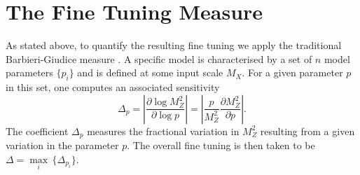 \documentclass[preprint,amsmath,amssymb,aps,superscriptaddress,prd,showpacs,floatfix,nofootinbib]{revtex4-1}
\begin{document}
\section{\label{sec:tuningmeasure}The Fine Tuning Measure}
As stated above, to quantify the resulting fine tuning we
apply the traditional Barbieri-Giudice measure
\cite{Ellis:1986yg,Barbieri:1987fn}. A specific model is characterised
by a set of $n$ model parameters $\{p_i\}$ and is defined at some
input scale $M_X$. For a given parameter $p$ in this set, one computes
an associated sensitivity
\begin{equation}\label{eq:bgmeasure}
\Delta_p=\left | \frac{\partial \log M_Z^2}{\partial \log p}\right
|=\left | \frac{p}{M_Z^2}\frac{\partial M_Z^2}{\partial p}\right |.
\end{equation}
The coefficient $\Delta_p$ measures the fractional variation in $M_Z^2$ resulting 
from a given variation in the parameter $p$. The overall fine tuning is then taken to be $\Delta
= \underset{i}{\max}\,\{\Delta_{p_i}\}$.\\
\end{document}

